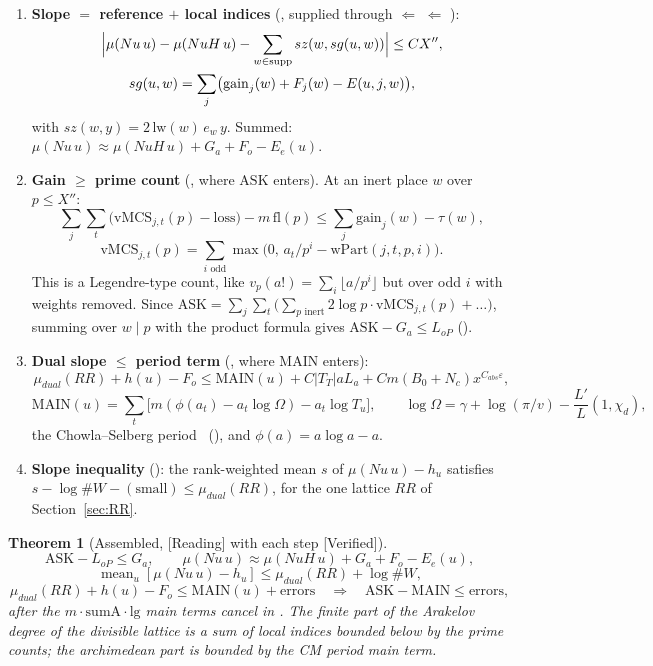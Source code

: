 \documentclass[11pt]{article}
\newcommand{\Verified}{\textcolor{verc}{\textsf{\small[Verified]}}}
\newcommand{\Reading}{\textcolor{readc}{\textsf{\small[Reading]}}}
\newcommand{\eps}{\varepsilon}
\newcommand{\ASK}{\mathrm{ASK}}
\newcommand{\MAIN}{\mathrm{MAIN}}
\theoremstyle{plain}
\newtheorem{theorem}{Theorem}[section]
\theoremstyle{definition}
\begin{document}
\begin{enumerate}
\item \textbf{Slope $=$ reference $+$ local indices} (, supplied through
   $\Leftarrow$  $\Leftarrow$ ):
  \begin{gather*}
  \Bigl|\mu(Nu\,u)-\mu(NuH\,u)-\sum_{w\in\mathrm{supp}} sz(w,sg(u,w))\Bigr|\le C X'',\\
  sg(u,w)=\sum_j\bigl(\mathrm{gain}_j(w)+F_j(w)-E(u,j,w)\bigr),
  \end{gather*}
  with $sz(w,y)=2\,\mathrm{lw}(w)\,e_w\,y$. Summed: $\mu(Nu\,u)\approx\mu(NuH\,u)+G_a+F_o-E_e(u)$.
\item \textbf{Gain $\ge$ prime count} (, where $\ASK$ enters). At an inert place $w$
  over $p\le X''$:
  \[
  \sum_j\sum_t\bigl(\mathrm{vMCS}_{j,t}(p)-\mathrm{loss}\bigr)-m\,\mathrm{fl}(p)\le\sum_j\mathrm{gain}_j(w)-\tau(w),
  \]
  \[
  \mathrm{vMCS}_{j,t}(p)=\sum_{i\text{ odd}}\max\bigl(0,\,a_t/p^i-\mathrm{wPart}(j,t,p,i)\bigr).
  \]
  This is a Legendre-type count, like $v_p(a!)=\sum_i\lfloor a/p^i\rfloor$ but over odd $i$ with
  weights removed. Since
  $\ASK=\sum_j\sum_t\bigl(\sum_{p\text{ inert}}2\log p\cdot\mathrm{vMCS}_{j,t}(p)+\dots\bigr)$, summing
  over $w\mid p$ with the product formula gives $\ASK-G_a\le L_{oP}$ ().
\item \textbf{Dual slope $\le$ period term} (, where $\MAIN$ enters):
  \[
  \mu_{dual}(RR)+h(u)-F_o\le\MAIN(u)+C|T_T|aL_a+Cm(B_0+N_c)x^{C_{abs}\eps},
  \]
  \[
  \MAIN(u)=\sum_t\bigl[m(\phi(a_t)-a_t\log\Omega)-a_t\log T_u\bigr],\qquad
  \log\Omega=\gamma+\log(\pi/v)-\frac{L'}{L}(1,\chi_d),
  \]
  the Chowla--Selberg period~\cite{chowla-selberg} (), and $\phi(a)=a\log a-a$.
\item \textbf{Slope inequality} (): the rank-weighted mean $s$ of
  $\mu(Nu\,u)-h_u$ satisfies $s-\log\#W-(\text{small})\le\mu_{dual}(RR)$, for the one lattice $RR$
  of Section~\ref{sec:RR}.
\end{enumerate}

\begin{theorem}[Assembled, \Reading{} with each step \Verified]
\[
\ASK-L_{oP}\le G_a,\qquad
\mu(Nu\,u)\approx\mu(NuH\,u)+G_a+F_o-E_e(u),
\]
\[
\operatorname{mean}_u[\mu(Nu\,u)-h_u]\le\mu_{dual}(RR)+\log\#W,
\]
\[
\mu_{dual}(RR)+h(u)-F_o\le\MAIN(u)+\text{errors}
\quad\Longrightarrow\quad \ASK-\MAIN\le\text{errors},
\]
after the $m\cdot\mathrm{sumA}\cdot\mathrm{lg}$ main terms cancel in . The finite
part of the Arakelov degree of the divisible lattice is a sum of local indices bounded below by the
prime counts; the archimedean part is bounded by the CM period main term.
\end{theorem}
\end{document}
